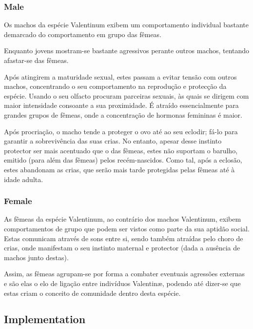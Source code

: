 \documentclass[a4paper]{article}
\begin{document}
\subsubsection{Male}

\indent \indent Os machos da espécie Valentinum exibem um comportamento individual bastante demarcado do comportamento em grupo das fêmeas.

Enquanto jovens mostram-se bastante agressivos perante outros machos, tentando afastar-se das fêmeas.

Após atingirem a maturidade sexual, estes passam a evitar tensão com outros machos, concentrando o seu comportamento na reprodução e protecção da espécie. Usando o seu olfacto procuram parceiras sexuais, às quais se dirigem com maior intensidade consoante a sua proximidade. É atraído essencialmente para grandes grupos de fêmeas, onde a concentração de hormonas femininas é maior.

Após procriação, o macho tende a proteger o ovo até ao seu eclodir; fá-lo para garantir a sobrevivência das suas crias. No entanto, apesar desse instinto protector ser mais acentuado que o das fêmeas, estes não suportam o barulho, emitido (para além das fêmeas) pelos recém-nascidos. Como tal, após a eclosão, estes abandonam as crias, que serão mais tarde protegidas pelas fêmeas até à idade adulta.

\subsubsection{Female}

\indent \indent As fêmeas da espécie Valentinum, ao contrário dos machos Valentinum, exibem comportamentos de grupo que podem ser vistos como parte da sua aptidão social. Estas comunicam através de sons entre si, sendo também atraídas pelo choro de crias, onde manifestam o seu instinto maternal e protector (dada a ausência de machos junto destas).

Assim, as fêmeas agrupam-se por forma a combater eventuais agressões externas e são elas o elo de ligação entre indivíduos Valentin\ae, podendo até dizer-se que estas criam o conceito de comunidade dentro desta espécie.

\subsection{Implementation}
\end{document}
